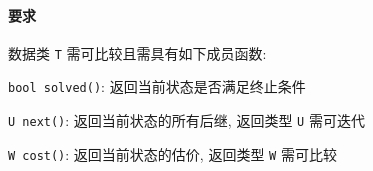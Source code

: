 \paragraph{要求}

数据类 \verb|T| 需可比较且需具有如下成员函数:

\verb|bool solved()|: 返回当前状态是否满足终止条件

\verb|U next()|: 返回当前状态的所有后继, 返回类型 \verb|U| 需可迭代

\verb|W cost()|: 返回当前状态的估价, 返回类型 \verb|W| 需可比较
